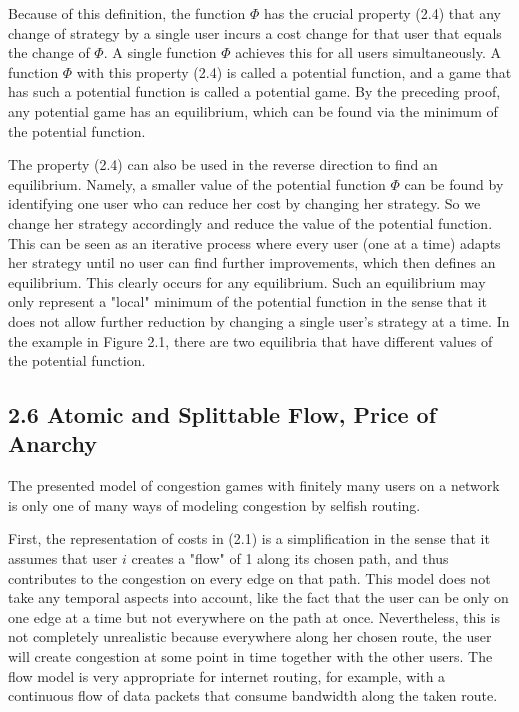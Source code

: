 \documentclass[12pt]{article}
\begin{document}
Because of this definition, the function $\Phi$ has the crucial property (2.4) that any change of strategy by a single user incurs a cost change for that user that equals\\
the change of $\Phi$. A single function $\Phi$ achieves this for all users simultaneously. A function $\Phi$ with this property (2.4) is called a potential function, and a game that has such a potential function is called a potential game. By the preceding proof, any potential game has an equilibrium, which can be found via the minimum of the potential function.

The property (2.4) can also be used in the reverse direction to find an equilibrium. Namely, a smaller value of the potential function $\Phi$ can be found by identifying one user who can reduce her cost by changing her strategy. So we change her strategy accordingly and reduce the value of the potential function. This can be seen as an iterative process where every user (one at a time) adapts her strategy until no user can find further improvements, which then defines an equilibrium. This clearly occurs for any equilibrium. Such an equilibrium may only represent a "local" minimum of the potential function in the sense that it does not allow further reduction by changing a single user's strategy at a time. In the example in Figure 2.1, there are two equilibria that have different values of the potential function.

\subsection*{2.6 Atomic and Splittable Flow, Price of Anarchy}
The presented model of congestion games with finitely many users on a network is only one of many ways of modeling congestion by selfish routing.

First, the representation of costs in (2.1) is a simplification in the sense that it assumes that user $i$ creates a "flow" of 1 along its chosen path, and thus contributes to the congestion on every edge on that path. This model does not take any temporal aspects into account, like the fact that the user can be only on one edge at a time but not everywhere on the path at once. Nevertheless, this is not completely unrealistic because everywhere along her chosen route, the user will create congestion at some point in time together with the other users. The flow model is very appropriate for internet routing, for example, with a continuous flow of data packets that consume bandwidth along the taken route.
\end{document}
